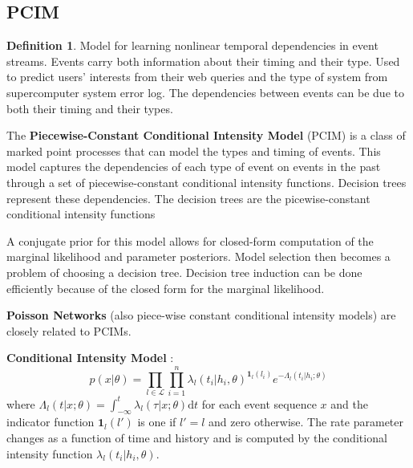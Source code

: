 \documentclass[12pt]{article}
\theoremstyle{plain}
\theoremstyle{definition}
\newtheorem{definition}{Definition}
\theoremstyle{remark}
\begin{document}
\pagebreak

\subsection{PCIM}

\begin{definition}
  Model for learning nonlinear temporal dependencies in event streams.
  Events carry both information about their timing and their type.
  Used to predict users' interests from their web queries and the type of system
  from supercomputer system error log.
  The dependencies between events can be due to both their timing and their
  types.

  The \textbf{Piecewise-Constant Conditional Intensity Model} (PCIM) is a class
  of marked point processes that can model the types and timing of events.
  This model captures the dependencies of each type of event on events in the
  past through a set of piecewise-constant conditional intensity functions.
  Decision trees represent these dependencies. The decision trees are the
  picewise-constant conditional intensity functions \citep{gunmeexu11}

  A conjugate prior for this model allows for closed-form computation of the
  marginal likelihood and parameter posteriors.
  Model selection then becomes a problem of choosing a decision tree.
  Decision tree induction can be done efficiently because of the closed form for
  the marginal likelihood.

  \textbf{Poisson Networks} \citep{rajgraher05} (also piece-wise constant
  conditional intensity models) are closely related to PCIMs.

\textbf{Conditional Intensity Model} \citep{did08,dalver09}:
\begin{equation*}
  p(x|\theta) = \prod_{l \in \mathcal{L}} \prod_{i=1}^{n}
  \lambda_l(t_i|h_i,\theta)^{\mathbf{1}_l(l_i)}
  e^{-\Lambda_l(t_i|h_i;\theta)}
\end{equation*}
where
$\Lambda_l(t|x;\theta) = \int_{-\infty}^t\lambda_l(\tau|x;\theta)\mathrm{d}t$
for each event sequence $x$ and the indicator function $\mathbf{1}_l(l')$ is one if
$l'=l$ and zero otherwise.
The rate parameter changes as a function of time and history and is computed by
the conditional intensity function $\lambda_l(t_i|h_i,\theta)$.


\end{definition}
\end{document}
